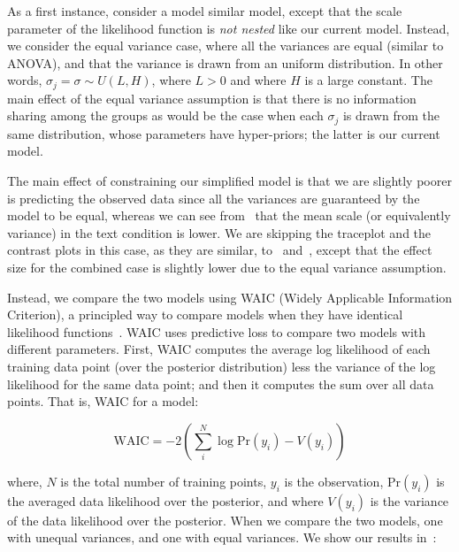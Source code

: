 As a first instance, consider a model similar model, except that the scale parameter of the likelihood function is \textit{not nested} like our current model. Instead, we consider the equal variance case, where all the variances are equal (similar to ANOVA), and that the variance is drawn from an uniform distribution. In other words, $\sigma_j = \sigma \sim U(L, H)$, where $L>0$ and where $H$ is a large constant. The main effect of the equal variance assumption is that there is no information sharing among the groups as would be the case when each $\sigma_j$ is drawn from the same distribution, whose parameters have hyper-priors; the latter is our current model.

The main effect of constraining our simplified model is that we are slightly poorer is predicting the observed data since all the variances are guaranteed by the model to be equal, whereas we can see from~ that the mean scale (or equivalently variance) in the text condition is lower. We are skipping the traceplot and the contrast plots in this case, as they are similar, to~ and~, except that the effect size for the combined case is slightly lower due to the equal variance assumption. 

Instead, we compare the two models using WAIC (Widely Applicable Information Criterion), a principled way to compare models when they have identical likelihood functions~\parencite{Gelman2014a}. WAIC uses predictive loss to compare two models with different parameters. First, WAIC computes the average log likelihood of each training data point (over the posterior distribution) less the variance of the log likelihood for the same data point; and then it computes the sum over all data points. That is, WAIC for a model: 

\begin{equation*}
    \mathrm{WAIC} = -2 \left (\sum_i^N \log \mathrm{Pr}(y_i) - V(y_i) \right) 
\end{equation*}

where, $N$ is the total number of training points, $y_i$ is the observation, $\mathrm{Pr}(y_i)$ is the averaged data likelihood over the posterior, and where $V(y_i)$ is the variance of the data likelihood over the posterior. When we compare the two models, one with unequal variances, and one with equal variances. We show our results in~:


